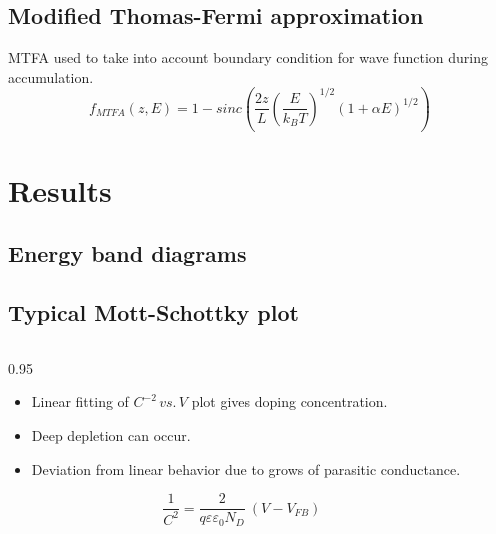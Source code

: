 \documentclass[final, xcolor=cmyk]{beamer}
\newcommand{\figfont}{\normalsize} %
\begin{document}
\begin{poster}
\vspace{-1ex}       
\subsection{Modified Thomas-Fermi approximation}
    MTFA used to take into account boundary condition for wave function during accumulation.  
    $$
    f_{MTFA}(z, E)  = 1 - sinc\left( \frac{2z}{L} \left(\frac{E}{k_BT}\right)^{1/2} \left(1+\alpha E\right)^{1/2}\right)
    $$
    
\newcolumn

\section{Results} \justifying
\subsection{Energy band diagrams}
        \centering{
        \figfont
        
        }
\vspace*{-4ex}

\subsection{Typical Mott-Schottky plot}
\vspace{0.5ex}
\newcommand{\figwidth}{0.545\columnwidth}
\begin{columns}[c]
    \begin{column}{0.95\columnwidth-\figwidth}
        \begin{itemize}   \itemsep15pt    
            \item  Linear fitting of $C^{-2}\,vs.\,V$ plot gives doping concentration.
            \item Deep depletion can occur.
            \item Deviation from linear behavior due to grows of parasitic conductance.
        \end{itemize}

        $$
        \frac1{C^2}=\frac2{q\varepsilon\varepsilon_0 N_D} \
                    \left( V- V_{FB} \right)
        $$

    \end{column}
    
    \begin{column}{0.005\columnwidth}
    \end{column}
    

\end{columns}
\end{poster}
\end{document}

